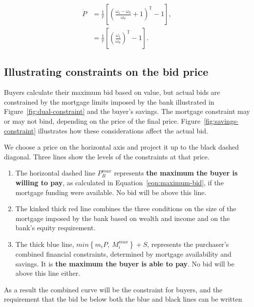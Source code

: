 


\begin{align}
\dot P  &= \frac{1}{r}\left[\left(\frac{\omega_t-\omega_0}{\omega_0}+1 \right)^\mathbb{T}-1\right], \nonumber\\
        &=\frac{1}{r}\left[\left(\frac{\omega_t}{\omega_0} \right)^\mathbb{T}-1\right]. \nonumber
\end{align}



\subsection{Illustrating constraints on the bid price} \label{sec:bids-and-reservation}
 
Buyers calculate their maximum bid based on value, but actual bids are constrained by the mortgage limits imposed by the bank illustrated in Figure~\ref{fig:dual-constraint} and the buyer's savings. The mortgage constraint may or may not bind, depending on the price of the final price. Figure~\ref{fig:savings-constraint} illustrates how these considerations affect the actual bid. 

We choose a price on the horizontal axis and project it up to the black dashed diagonal. Three lines show the levels of the constraints at that price.
\begin{enumerate}
    \item The horizontal dashed line $P_B^{max}$ represents \textbf{the maximum the buyer is willing to pay}, as calculated in Equation~\ref{eqn:maximum-bid}, if the mortgage funding were available. No bid will be above this line. 

    \item The kinked thick red line combines the three conditions on the size of the mortgage imposed by the bank based on wealth and income and on the bank's equity requirement.
   
    \item The thick blue line, $min\left\{m_i P,\  M_{i}^{max}\right\}+ S $, represents the purchaser's combined financial constraints, determined by mortgage availability and savings. It is \textbf{the maximum the buyer is able to pay}.  No bid will be above this line either.
\end{enumerate}
 As a result the combined curve will be the constraint for buyers, and the requirement that the bid be below both the blue and black lines can be written

